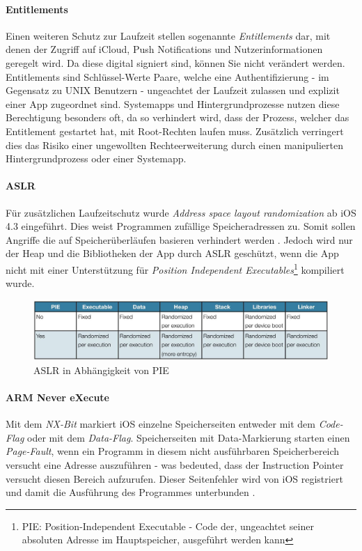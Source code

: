 		\paragraph{Entitlements}
			Einen weiteren Schutz zur Laufzeit stellen sogenannte \textsl{Entitlements}
			dar, mit denen der Zugriff auf iCloud, Push	Notifications und
			Nutzerinformationen geregelt wird. Da diese digital signiert sind, können Sie
			nicht verändert werden. Entitlements sind Schlüssel-Werte Paare, welche eine
			Authentifizierung - im Gegensatz zu UNIX Benutzern - ungeachtet der Laufzeit
			zulassen und explizit einer App zugeordnet sind.
			Systemapps und Hintergrundprozesse nutzen diese Berechtigung besonders oft,
			da so verhindert wird, dass der Prozess, welcher das Entitlement gestartet
			hat, mit Root-Rechten laufen muss.
			Zusätzlich verringert dies das Risiko einer ungewollten Rechteerweiterung
			durch einen manipulierten Hintergrundprozess oder einer Systemapp.
		
		\paragraph{ASLR}\label{sec:ios-aslr}
			Für zusätzlichen Laufzeitschutz wurde \textsl{Address space layout
			randomization} \cite[S.1]{iOS4SecurityEvalutaion} ab iOS 4.3 eingeführt. Dies
			weist Programmen zufällige Speicheradressen zu. Somit sollen Angriffe die auf
			Speicherüberläufen basieren verhindert werden \cite[S.131]{Levin2012}. Jedoch
			wird nur der Heap und die Bibliotheken der App durch
			ASLR geschützt, wenn die App nicht mit einer Unterstützung für
			\textsl{Position Independent Executables}\footnote{PIE: Position-Independent
			Executable - Code der, ungeachtet seiner absoluten Adresse im Hauptspeicher,
			ausgeführt werden kann} kompiliert wurde.
			\begin{figure}[h]
				\centering
				\includegraphics[width=0.9\linewidth]{ios/media/aslr-pie.jpg}
				\caption{ASLR in Abhängigkeit von PIE
				\cite[S.1]{iOS4SecurityEvalutaion}}
				\label{fig:aslr}
			\end{figure}
		
		\paragraph{ARM Never eXecute}
			Mit dem \textsl{NX-Bit} markiert iOS einzelne Speicherseiten entweder mit dem
			\textsl{Code-Flag} oder mit dem \textsl{Data-Flag}. Speicherseiten mit
			Data-Markierung starten einen \textsl{Page-Fault}, wenn ein Programm in
			diesem nicht ausführbaren Speicherbereich versucht eine Adresse auszuführen
			- was bedeuted, dass der Instruction Pointer versucht diesen Bereich
			aufzurufen. Dieser Seitenfehler wird von iOS registriert und damit die
			Ausführung des Programmes unterbunden \cite[S.310]{Levin2012}.